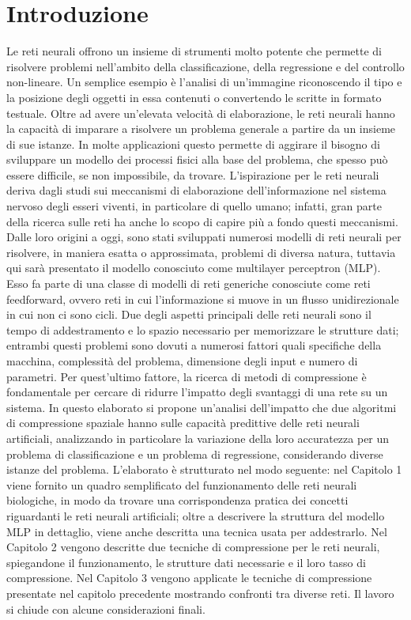 \documentclass[11pt,a4paper,twoside,
openright]{book}
\begin{document}
\tableofcontents

\chapter*{Introduzione}
Le reti neurali offrono un insieme di strumenti molto potente che permette di risolvere problemi nell'ambito della classificazione, della regressione e del controllo non-lineare. Un semplice esempio è l'analisi di un'immagine riconoscendo il tipo e la posizione degli oggetti in essa contenuti o convertendo le scritte in formato testuale.
Oltre ad avere un'elevata velocità di elaborazione, le reti neurali hanno la capacità di imparare a risolvere un problema generale a partire da un insieme di sue istanze. In molte applicazioni questo permette di aggirare il bisogno di sviluppare un modello dei processi fisici alla base del problema, che spesso può essere difficile, se non impossibile, da trovare.
L'ispirazione per le reti neurali deriva dagli studi sui meccanismi di elaborazione dell'informazione nel sistema nervoso degli esseri viventi, in particolare di quello umano; infatti, gran parte della ricerca sulle reti ha anche lo scopo di capire più a fondo questi meccanismi.
Dalle loro origini a oggi, sono stati sviluppati numerosi modelli di reti neurali per risolvere, in maniera esatta o approssimata, problemi di diversa natura, tuttavia qui sarà presentato il modello conosciuto come multilayer perceptron (MLP). Esso fa parte di una classe di modelli di reti generiche conosciute come reti feedforward, ovvero reti in cui l'informazione si muove in un flusso unidirezionale in cui non ci sono cicli.
Due degli aspetti principali delle reti neurali sono il tempo di addestramento e lo spazio necessario per memorizzare le strutture dati; entrambi questi problemi sono dovuti a numerosi fattori  quali specifiche della macchina, complessità del problema, dimensione degli input e numero di parametri. Per quest'ultimo fattore, la ricerca di metodi di compressione è fondamentale per cercare di ridurre l'impatto degli svantaggi di una rete su un sistema. 
In questo elaborato si propone un'analisi dell'impatto che due algoritmi di compressione spaziale hanno sulle capacità predittive delle reti neurali artificiali, analizzando in particolare la variazione della loro accuratezza per un problema di classificazione e un problema di regressione, considerando diverse istanze del problema.
L'elaborato è strutturato nel modo seguente: nel Capitolo 1 viene fornito un quadro semplificato del funzionamento delle reti neurali biologiche, in modo da trovare una corrispondenza pratica dei concetti riguardanti le reti neurali artificiali; oltre a descrivere la struttura del modello MLP in dettaglio, viene anche descritta una tecnica usata per addestrarlo. Nel Capitolo 2 vengono descritte due tecniche di compressione per le reti neurali, spiegandone il funzionamento, le strutture dati necessarie e il loro tasso di compressione.
Nel Capitolo 3 vengono applicate le tecniche di compressione presentate nel capitolo precedente mostrando confronti tra diverse reti. Il lavoro si chiude con alcune considerazioni finali.
\end{document}
